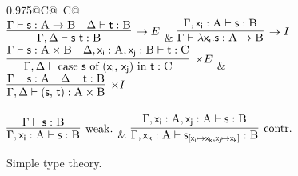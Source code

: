 \begin{figure}
	\centering
	\begin{tabularx}{0.975\textwidth}{@{}C@{~}C@{}}
		\\[2em]
		$\infer[\to E]{\Gamma, \Delta \vdash \term{s~t} : \prop B}{\Gamma \vdash \term{s} : \prop A \to \prop B & \Delta \vdash \term{t} : \prop B}$ 
		& 
		$\infer[\to I]{\Gamma \vdash \term{\lambda x_i.s} : \prop A \to \prop B}{\Gamma, \term{x_i}: \prop A \vdash \term{s}:\prop B}$\\[2em]
		$\infer[\times E]
			{\Gamma,\Delta \vdash
			 \cterm{case \term{s} of (\term{x_i}, \term{x_j}) in \term{t}} 
			 : \prop{C}}
			{\Gamma \vdash \term{s}: \prop A \times \prop B & 
			\Delta, \term{x_i}: \prop A , \term{x_j}: \prop B \vdash \term{t}: \prop{C}}$ 
		&
		$\infer[\times I]
			{\Gamma, \Delta \vdash \cterm{(\term{s}, \term{t})}: \prop{A} \times \prop{B}}
			{\Gamma \vdash \term{s}: \prop{A} & \Delta \vdash \term{t}:\prop{B}}$\\[\smallsep]
		\\[2em]
		$\infer[\Weakening{}]
			{\Gamma, \term{x_i}: \prop{A} \vdash \term{s}: \prop{B}}
			{\Gamma \vdash \term{s}:\prop{B}} $ 
		&
		$\infer[\Contraction{}]
			{\Gamma, \term{x_k}: \prop{A} \vdash \term{s}_{[\term{x_i} \mapsto \term{x_k}, \term{x_j} \mapsto \term{x_k}]}:\prop{B}}
			{\Gamma,  \term{x_i}: \prop{A}, \term{x_j}: \prop{A} \vdash \term{s}: \prop{B}}$
		\end{tabularx}
	\caption{Simple type theory.}
	\label{figure:simple_type_theory}
\end{figure}

